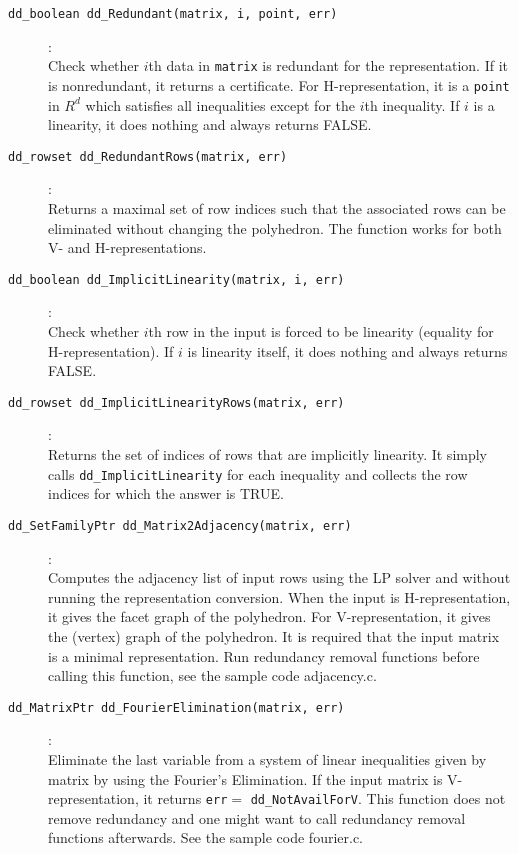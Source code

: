 \documentclass[11pt]{article}
\newcommand {\0} {{\bf 0}}
\begin{document}
\begin{description}
\item[{\tt dd\_boolean dd\_Redundant(matrix, i, point, err)}]:\\
Check whether $i$th data in {\tt matrix} is redundant for the representation.
If it is nonredundant, it returns a certificate.  For H-representation,
it is a {\tt point} in $R^d$ which satisfies
all inequalities except for the $i$th inequality.  If $i$ is a linearity,
it does nothing and always returns FALSE.

\item[{\tt dd\_rowset dd\_RedundantRows(matrix, err)}]:\\
Returns a maximal set of row indices such that the associated rows
can be eliminated without changing the polyhedron.  
The function works for both V- and H-representations.

\item[{\tt dd\_boolean dd\_ImplicitLinearity(matrix, i, err)}]:\\
Check whether $i$th row
in the input is forced to be linearity (equality 
for H-representation).
If $i$ is linearity itself, 
it does nothing and always returns FALSE.

\item[{\tt dd\_rowset dd\_ImplicitLinearityRows(matrix, err)}]:\\
Returns the set of indices of rows that are 
implicitly linearity.  It simply calls
{\tt dd\_ImplicitLinearity} for each inequality and collects
the row indices for which the answer is TRUE.

\item[{\tt dd\_SetFamilyPtr dd\_Matrix2Adjacency(matrix, err)}]:\\
Computes the adjacency list of input rows using
the LP solver and without running the representation conversion.  When
the input is H-representation, it gives the facet graph of the polyhedron.
For V-representation, it gives the (vertex) graph of the polyhedron.
It is required that the input matrix is a minimal representation.
Run redundancy removal functions before calling this function,
see the sample code adjacency.c. 

\item[{\tt dd\_MatrixPtr dd\_FourierElimination(matrix, err)}]:\\
Eliminate the last variable from a system of linear inequalities
given by matrix by using the Fourier's Elimination.  If the 
input matrix is V-representation, it returns
{\tt  err}$=$ {\tt dd\_NotAvailForV}.   This function does not
remove redundancy  and one might want to call
redundancy removal functions afterwards. See the sample code fourier.c.


\end{description}
\end{document}
